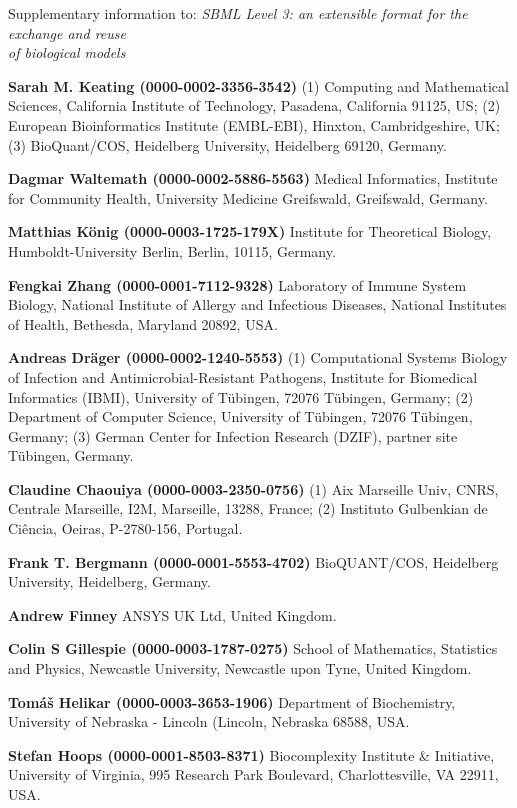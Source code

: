 \documentclass{sbml-paper}
\begin{document}
Supplementary information to: \textit{SBML Level 3: an extensible format for the exchange and reuse\\of biological models}

\textbf{Sarah M. Keating (0000-0002-3356-3542)} (1) Computing and Mathematical Sciences, California Institute of Technology, Pasadena, California 91125, US; (2) European Bioinformatics Institute (EMBL-EBI), Hinxton, Cambridgeshire, UK; (3) BioQuant/COS, Heidelberg University, Heidelberg 69120, Germany.

\textbf{Dagmar Waltemath (0000-0002-5886-5563)} Medical Informatics, Institute for Community Health, University Medicine Greifswald, Greifswald, Germany.

\textbf{Matthias K\"{o}nig (0000-0003-1725-179X)} Institute for Theoretical Biology, Humboldt-University Berlin, Berlin, 10115, Germany.

\textbf{Fengkai Zhang (0000-0001-7112-9328)} Laboratory of Immune System Biology, National Institute of Allergy and Infectious Diseases, National Institutes of Health, Bethesda, Maryland 20892, USA.

\textbf{Andreas Dräger (0000-0002-1240-5553)} (1) Computational Systems Biology of Infection and Antimicrobial-Resistant Pathogens, Institute for Biomedical Informatics (IBMI), University of Tübingen, 72076 Tübingen, Germany; (2) Department of Computer Science, University of Tübingen, 72076 Tübingen, Germany; (3) German Center for Infection Research (DZIF), partner site Tübingen, Germany.

\textbf{Claudine Chaouiya (0000-0003-2350-0756)} (1) Aix Marseille Univ, CNRS, Centrale Marseille, I2M, Marseille, 13288, France; (2) Instituto Gulbenkian de Ciência, Oeiras, P-2780-156, Portugal.

\textbf{Frank T. Bergmann (0000-0001-5553-4702)} BioQUANT/COS, Heidelberg University, Heidelberg, Germany.

\textbf{Andrew Finney} ANSYS UK Ltd, United Kingdom.
	
\textbf{Colin S Gillespie (0000-0003-1787-0275)} School of Mathematics, Statistics and Physics, Newcastle University, Newcastle upon Tyne, United Kingdom.

\textbf{Tomáš Helikar (0000-0003-3653-1906)} Department of Biochemistry, University of Nebraska - Lincoln (Lincoln, Nebraska 68588, USA.

\textbf{Stefan Hoops (0000-0001-8503-8371)} Biocomplexity Institute & Initiative, University of Virginia, 995 Research Park Boulevard, Charlottesville, VA 22911, USA.
\end{document}
